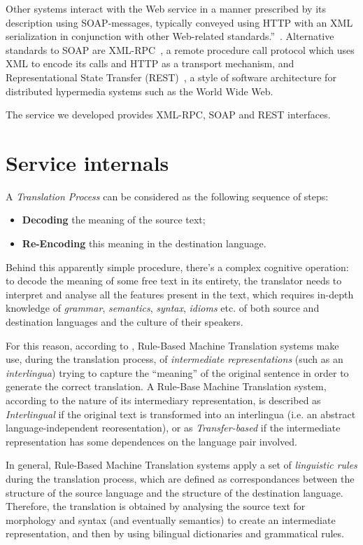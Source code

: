 \documentclass[11pt]{article}
\begin{document}
Other systems interact with the Web service in a manner prescribed by its description using SOAP-messages, typically conveyed using HTTP with an XML serialization in conjunction with other Web-related standards.''~\citep{wsgloss}. Alternative standards to SOAP are XML-RPC~\citep{xmlrpcspec}, a remote procedure call protocol which uses XML to encode its calls and HTTP as a transport mechanism, and Representational State Transfer (REST)~\citep{rest}, a style of software architecture for distributed hypermedia systems such as the World Wide Web.

The service we developed provides XML-RPC, SOAP and REST interfaces.


\section{Service internals}

A \emph{Translation Process} can be considered as the following sequence of steps:

\begin{itemize}
 \item {\bf Decoding} the meaning of the source text;
 \item {\bf Re-Encoding} this meaning in the destination language.
\end{itemize}

Behind this apparently simple procedure, there's a complex cognitive operation: to decode the meaning of some free text in its entirety, the translator needs to interpret and analyse all the features present in the text, which requires in-depth knowledge of \emph{grammar}, \emph{semantics}, \emph{syntax}, \emph{idioms} etc. of both source and destination languages and the culture of their speakers.

For this reason, according to \cite{arnoldea}, Rule-Based Machine Translation systems make use, during the translation process, of \emph{intermediate representations} (such as an \emph{interlingua}) trying to capture the ``meaning'' of the original sentence in order to generate the  correct translation. A Rule-Base Machine Translation system, according to the nature of its intermediary representation, is described as \emph{Interlingual} if the original text is transformed into an interlingua (i.e. an abstract language-independent reoresentation), or as \emph{Transfer-based} if the intermediate representation has some dependences on the language pair involved.

In general, Rule-Based Machine Translation systems apply a set of \emph{linguistic rules} during the translation process, which are defined as correspondances between the structure of the source language and the structure of the destination language. Therefore, the translation is obtained by analysing the source text for morphology and syntax (and eventually semantics) to create an intermediate representation, and then by using bilingual dictionaries and grammatical rules.
\end{document}

